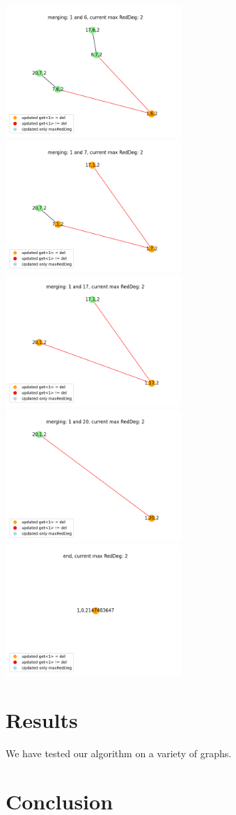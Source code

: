 \documentclass[10pt]{article}
\begin{document}
\includegraphics[width=0.5\textwidth]{images/merge20.png}
\includegraphics[width=0.5\textwidth]{images/merge21.png}
\includegraphics[width=0.5\textwidth]{images/merge22.png}
\includegraphics[width=0.5\textwidth]{images/merge23.png}
\includegraphics[width=0.5\textwidth]{images/merge24.png}

\section{Results}
We have tested our algorithm on a variety of graphs.

\section{Conclusion}



\end{document}
